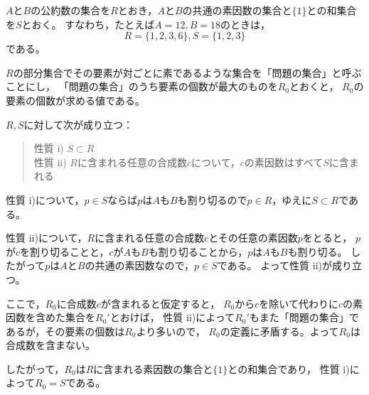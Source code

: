 \documentclass{article}
\begin{document}
$A$と$B$の公約数の集合を$R$とおき，$A$と$B$の共通の素因数の集合と$\{1\}$との和集合を$S$とおく。
すなわち，たとえば$A = 12, B = 18$のときは，
\[
    R = \{1, 2, 3, 6\}, S = \{1, 2, 3\}
\]
である。

$R$の部分集合でその要素が対ごとに素であるような集合を「問題の集合」と呼ぶことにし，
「問題の集合」のうち要素の個数が最大のものを$R_0$とおくと，
$R_0$の要素の個数が求める値である。

$R, S$に対して次が成り立つ：
\begin{quote}
    性質 i) $S \subset R$ \\
    性質 ii) $R$に含まれる任意の合成数$c$について，$c$の素因数はすべて$S$に含まれる
\end{quote}

性質 i)について，$p \in S$ならば$p$は$A$も$B$も割り切るので$p \in R$，ゆえに$S \subset R$である。

性質 ii)について，$R$に含まれる任意の合成数$c$とその任意の素因数$p$をとると，
$p$が$c$を割り切ることと，$c$が$A$も$B$も割り切ることから，$p$は$A$も$B$も割り切る。
したがって$p$は$A$と$B$の共通の素因数なので，$p \in S$である。
よって性質 ii)が成り立つ。

ここで，$R_0$に合成数$c$が含まれると仮定すると，
$R_0$から$c$を除いて代わりに$c$の素因数を含めた集合を$R_0'$とおけば，
性質 ii)によって$R_0'$もまた「問題の集合」であるが，その要素の個数は$R_0$より多いので，
$R_0$の定義に矛盾する。よって$R_0$は合成数を含まない。

したがって，$R_0$は$R$に含まれる素因数の集合と$\{1\}$との和集合であり，
性質 i)によって$R_0 = S$である。
\end{document}
